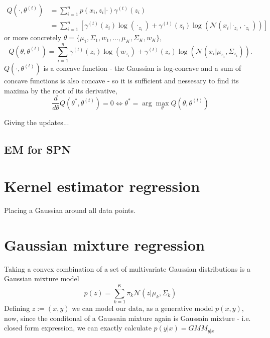 \begin{align*}
    Q(\cdot, \theta^{(t)}) &= \sum_{i=1}^n p(x_i,z_i|\cdot) \gamma^{(t)}(z_i) \\
    &= \sum_{i=1}^n \left[ \gamma^{(t)}(z_i) \log(\cdot_{z_i})+\gamma^{(t)}(z_i) 
    \log(\mathcal{N}(x_i| \cdot_{z_i} , \cdot_{z_i}))\right]
\end{align*}
or more concretely $\theta = \{\mu_1 , \Sigma_1,w_1, \dots, \mu_K , \Sigma_K, w_K\}$, 
$$ Q(\theta, \theta^{(t)}) = \sum_{i=1}^n \gamma^{(t)}(z_i) \log(w_{z_i})+\gamma^{(t)}(z_i) \log(\mathcal{N}(x_i| \mu_{z_i} , \Sigma_{z_i})).$$
$Q(\cdot, \theta^{(t)})$ is a concave function - the Gaussian is log-concave and a sum of concave functions is 
also concave - so it is sufficient and nessesary to find its maxima by the root of its derivative, 
$$\frac{d}{d \theta} Q(\theta^*, \theta^{(t)}) = 0 \iff \theta^* = \arg\max_{\theta} Q(\theta, \theta^{(t)})$$

Giving the updates...

\subsection*{EM for SPN}




\section{Kernel estimator regression}
Placing a Gaussian around all data points.

\section{Gaussian mixture regression}
Taking a convex combination of a set of multivariate Gaussian distributions is a Gaussian mixture model
$$p(z) = \sum_{k=1}^K \pi_k \mathcal{N}(z|\mu_k, \Sigma_k)$$  
Defining $z := (x,y)$ we can model our data, as a generative model $p(x,y)$, now, since the conditonal 
of a Gaussain mixture again is Gaussain mixture - i.e. closed form expression, we can exactly calculate
$p(y|x) = GMM_{y|x}$

